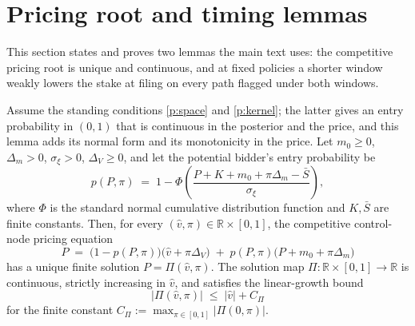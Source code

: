 
\section{Pricing root and timing lemmas}
\label{sec:pricing-timing-lemmas}

This section states and proves two lemmas the main text uses: the competitive pricing root is
unique and continuous, and at fixed policies a shorter window weakly lowers the stake at filing
on every path flagged under both windows.

\begin{lemma}
\label{lem:pricing-root}
Assume the standing conditions \ref{p:space} and \ref{p:kernel}; the latter gives an entry
probability in $(0,1)$ that is continuous in the posterior and the price, and this lemma adds its
normal form and its monotonicity in the price. Let $m_0 \ge 0$, $\Delta_m > 0$, $\sigma_\xi > 0$,
$\Delta_V \ge 0$, and let the potential bidder's entry probability be
\begin{equation}
\label{eq:bidder-entry-prob}
p(P, \pi) \;=\; 1 - \Phi\!\left(\frac{P + K + m_0 + \pi\Delta_m - \bar S}{\sigma_\xi}\right),
\end{equation}
where $\Phi$ is the standard normal cumulative distribution function and $K, \bar S$ are finite constants. Then, for every $(\hat v, \pi) \in \mathbb{R} \times [0, 1]$, the competitive control-node pricing equation
\begin{equation}
\label{eq:pricing-fixed-point}
P \;=\; \bigl(1 - p(P, \pi)\bigr)\bigl(\hat v + \pi\Delta_V\bigr) \;+\; p(P, \pi)\bigl(P + m_0 + \pi\Delta_m\bigr)
\end{equation}
has a unique finite solution $P = \Pi(\hat v, \pi)$. The solution map $\Pi: \mathbb{R} \times [0, 1] \to \mathbb{R}$ is continuous, strictly increasing in $\hat v$, and satisfies the linear-growth bound
\begin{equation}
\label{eq:pricing-growth-bound}
|\Pi(\hat v, \pi)| \;\le\; |\hat v| + C_\Pi
\end{equation}
for the finite constant $C_\Pi := \max_{\pi \in [0, 1]} |\Pi(0, \pi)|$.
\end{lemma}

